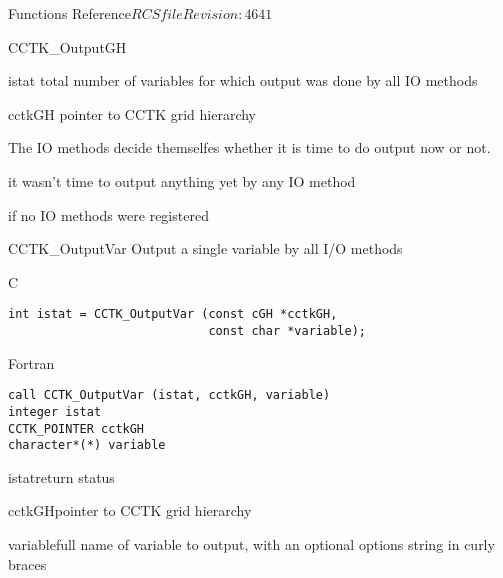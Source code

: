\begin{cactuspart}{ Functions Reference}{$RCSfile$}{$Revision: 4641 $}
\begin{FunctionDescription}{CCTK\_OutputGH}
\begin{ParameterSection}
\begin{Parameter}{istat}
total number of variables for which output was done by all IO methods
\end{Parameter}
\begin{Parameter}{cctkGH}
pointer to CCTK grid hierarchy
\end{Parameter}
\end{ParameterSection}

\begin{Discussion}
The IO methods decide themselfes whether it is time to do output now or not.
\end{Discussion}

\begin{ErrorSection}
\begin{Error}{0}
it wasn't time to output anything yet by any IO method
\end{Error}
\begin{Error}{-1}
if no IO methods were registered
\end{Error}
\end{ErrorSection}
\end{FunctionDescription}


\begin{FunctionDescription}{CCTK\_OutputVar}
Output a single variable by all I/O methods
\label{CCTK-OutputVar}

\begin{SynopsisSection}
\begin{Synopsis}{C}
\begin{verbatim}
int istat = CCTK_OutputVar (const cGH *cctkGH,
                            const char *variable);
\end{verbatim}
\end{Synopsis}
\begin{Synopsis}{Fortran}
\begin{verbatim}
call CCTK_OutputVar (istat, cctkGH, variable)
integer istat
CCTK_POINTER cctkGH
character*(*) variable
\end{verbatim}
\end{Synopsis}
\end{SynopsisSection}

\begin{ParameterSection}
\begin{Parameter}{istat}return status\end{Parameter}
\begin{Parameter}{cctkGH}pointer to CCTK grid hierarchy\end{Parameter}
\begin{Parameter}{variable}full name of variable to output, with an optional
options string in curly braces\end{Parameter}
\end{ParameterSection}


\end{FunctionDescription}
\end{cactuspart}
